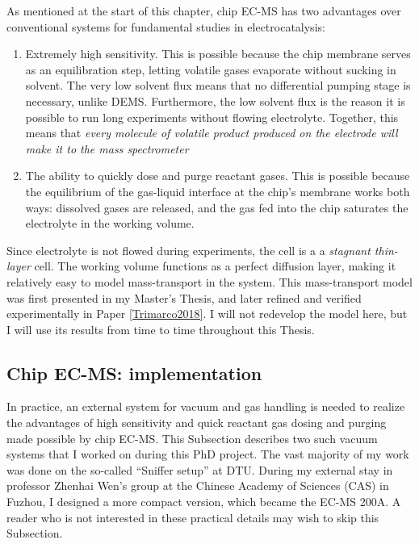 As mentioned at the start of this chapter, chip EC-MS has two advantages over conventional systems for fundamental studies in electrocatalysis:

\begin{enumerate}
\item Extremely high sensitivity. This is possible because the chip membrane serves as an equilibration step, letting volatile gases evaporate without sucking in solvent. The very low solvent flux means that no differential pumping stage is necessary, unlike DEMS. Furthermore, the low solvent flux is the reason it is possible to run long experiments without flowing electrolyte. Together, this means that \textit{every molecule of volatile product produced on the electrode will make it to the mass spectrometer} 

\item The ability to quickly dose and purge reactant gases. This is possible because the equilibrium of the gas-liquid interface at the chip's membrane works both ways: dissolved gases are released, and the gas fed into the chip saturates the electrolyte in the working volume.
\end{enumerate}

Since electrolyte is not flowed during experiments, the cell is a a \textit{stagnant thin-layer} cell. The working volume functions as a perfect diffusion layer, making it relatively easy to model mass-transport in the system. This mass-transport model was first presented in my Master's Thesis\cite{Scott2016_MSc}, and later refined and verified experimentally in Paper \ref{Trimarco2018}. I will not redevelop the model here, but I will use its results from time to time throughout this Thesis.

\subsection{Chip EC-MS: implementation}\label{subsec:setups}

In practice, an external system for vacuum and gas handling is needed to realize the advantages of high sensitivity and quick reactant gas dosing and purging made possible by chip EC-MS. This Subsection describes two such vacuum systems that I worked on during this PhD project. The vast majority of my work was done on the so-called ``Sniffer setup'' at DTU. During my external stay in professor Zhenhai Wen's group at the Chinese Academy of Sciences (CAS) in Fuzhou, I designed a more compact version, which became the EC-MS 200A. A reader who is not interested in these practical details may wish to skip this Subsection. 

